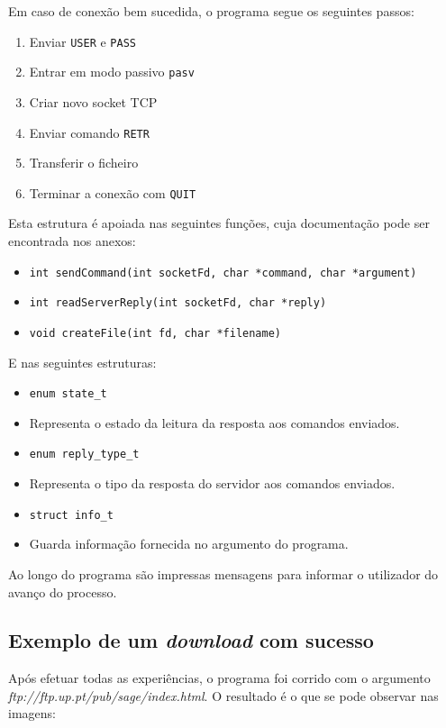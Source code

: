 \documentclass{article}
\begin{document}
Em caso de conexão bem sucedida, o programa segue os seguintes passos:
\begin{enumerate}
\item Enviar \texttt{USER} e \texttt{PASS}
\item Entrar em modo passivo \texttt{pasv}
\item Criar novo socket TCP
\item Enviar comando \texttt{RETR}
\item Transferir o ficheiro
\item Terminar a conexão com \texttt{QUIT}
\end{enumerate}

Esta estrutura é apoiada nas seguintes funções, cuja documentação pode ser encontrada nos anexos:
\begin{itemize}
\item \texttt{int sendCommand(int socketFd, char *command, char *argument)}
\item \texttt{int readServerReply(int socketFd, char *reply)}
\item \texttt{void createFile(int fd, char *filename)}
\end{itemize}

E nas seguintes estruturas:

\begin{itemize}
\item \texttt{enum state_t}
\item[] Representa o estado da leitura da resposta aos comandos enviados.
\item \texttt{enum reply_type_t}
\item[] Representa o tipo da resposta do servidor aos comandos enviados. 
\item \texttt{struct info_t}
\item[] Guarda informação fornecida no argumento do programa. 
\end{itemize}


Ao longo do programa são impressas mensagens para informar o utilizador do avanço do processo.
\subsection{Exemplo de um \textit{download} com sucesso}
Após efetuar todas as experiências, o programa foi corrido 
com o argumento \newline \textit{ftp://ftp.up.pt/pub/sage/index.html}.
O resultado é o que se pode observar nas imagens:
\end{document}
